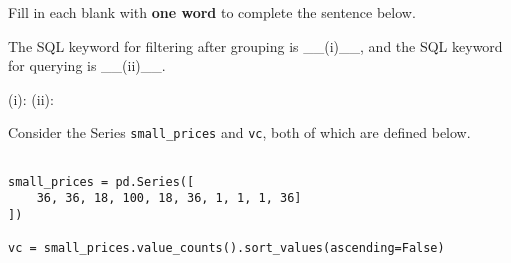 \documentclass[twoside,12pt]{article}
\begin{document}
\begin{probset}
\begin{prob}
\begin{subprobset}







\end{subprobset}
    
\end{prob}

\vspace{1in}

\begin{prob}

Fill in each blank with \textbf{one word} to complete the sentence below.

The SQL keyword for filtering after grouping is \_\_(i)\_\_, and the SQL keyword for querying is \_\_(ii)\_\_.

(i): \inlineresponsebox[3in]{} (ii): \inlineresponsebox[3in]{}

\end{prob}

\newpage

\begin{prob}

Consider the Series \texttt{small\_prices} and \texttt{vc}, both of which are defined below.

\begin{verbatim}

small_prices = pd.Series([
    36, 36, 18, 100, 18, 36, 1, 1, 1, 36]
])

vc = small_prices.value_counts().sort_values(ascending=False)

\end{verbatim}




\end{prob}
\end{probset}
\end{document}
